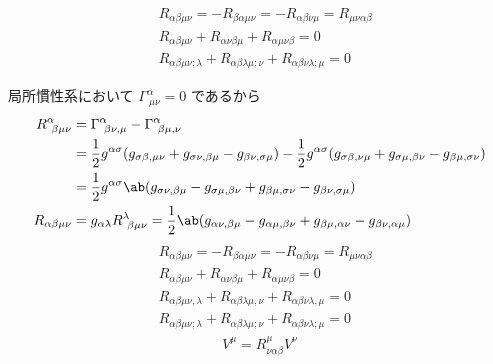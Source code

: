 \documentclass[uplatex,dvipdfmx,a4paper,11pt]{jlreq}
\theoremstyle{definition}
\begin{document}
\begin{theorem}
  \begin{align}
     & R_{\alpha\beta\mu\nu} = -R_{\beta\alpha\mu\nu} = -R_{\alpha\beta\nu\mu} = R_{\mu\nu\alpha\beta}   \\
     & R_{\alpha\beta\mu\nu} + R_{\alpha\nu\beta\mu} + R_{\alpha\mu\nu\beta} = 0                         \\
     & R_{\alpha\beta\mu\nu;\lambda} + R_{\alpha\beta\lambda\mu;\nu} + R_{\alpha\beta\nu\lambda;\mu} = 0
  \end{align}
\end{theorem}
局所慣性系において $\Gamma^\alpha_{\ \mu\nu} = 0$ であるから
\begin{align}
  R^\alpha_{\ \beta\mu\nu} & = \Gamma^\alpha_{\ \beta\nu,\mu} - \Gamma^\alpha_{\ \beta\mu,\nu}                                                                                                                                               \\
                           & = \frac{1}{2}g^{\alpha\sigma}(g_{\sigma\beta,\mu\nu} + g_{\sigma\nu,\beta\mu} - g_{\beta\nu,\sigma\mu}) - \frac{1}{2}g^{\alpha\sigma}(g_{\sigma\beta,\nu\mu} + g_{\sigma\mu,\beta\nu} - g_{\beta\mu,\sigma\nu}) \\
                           & = \frac{1}{2}g^{\alpha\sigma}\ab(g_{\sigma\nu,\beta\mu} - g_{\sigma\mu,\beta\nu} + g_{\beta\mu,\sigma\nu} - g_{\beta\nu,\sigma\mu})                                                                             \\
  R_{\alpha\beta\mu\nu}    & = g_{\alpha\lambda}R^\lambda_{\ \beta\mu\nu} = \frac{1}{2}\ab(g_{\alpha\nu,\beta\mu} - g_{\alpha\mu,\beta\nu} + g_{\beta\mu,\alpha\nu} - g_{\beta\nu,\alpha\mu})
\end{align}
\begin{align}
   & R_{\alpha\beta\mu\nu} = -R_{\beta\alpha\mu\nu} = -R_{\alpha\beta\nu\mu} = R_{\mu\nu\alpha\beta}   \\
   & R_{\alpha\beta\mu\nu} + R_{\alpha\nu\beta\mu} + R_{\alpha\mu\nu\beta} = 0                         \\
   & R_{\alpha\beta\mu\nu,\lambda} + R_{\alpha\beta\lambda\mu,\nu} + R_{\alpha\beta\nu\lambda,\mu} = 0 \\
   & R_{\alpha\beta\mu\nu;\lambda} + R_{\alpha\beta\lambda\mu;\nu} + R_{\alpha\beta\nu\lambda;\mu} = 0
\end{align}
\begin{align}
  [\nabla_\alpha,\nabla_\beta]V^\mu = R^\mu_{\nu\alpha\beta}V^\nu
\end{align}
\end{document}
